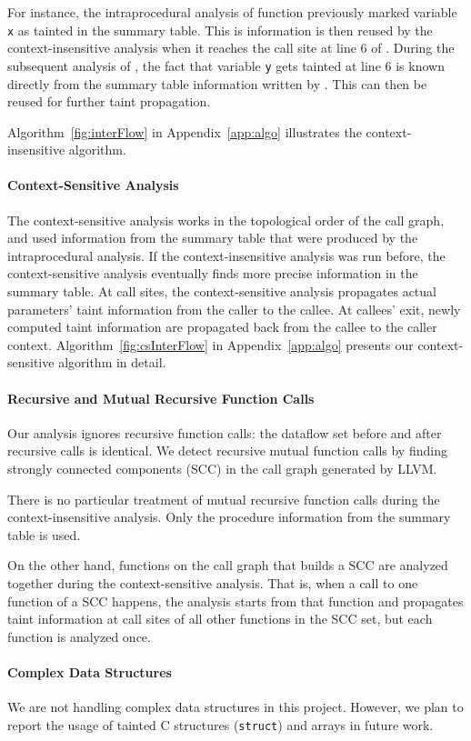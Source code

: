 For instance, the intraprocedural analysis of function
\main{} previously marked variable \texttt{x} as tainted
in the summary table. This is information is then reused by
the context-insensitive analysis when it reaches the
call site at line $6$ of \main{}.
During the subsequent analysis of \main{}, the fact that
variable \texttt{y} gets tainted at line $6$ is known
directly from the summary table information written
by \compute{}. This can then be reused for further
taint propagation.

Algorithm~\ref{fig:interFlow} in Appendix~\ref{app:algo}
illustrates the context-insensitive algorithm.

\paragraph{Context-Sensitive Analysis}
The context-sensitive analysis works in the topological order
of the call graph, and used information from the summary table
that were produced by the intraprocedural analysis. If the
context-insensitive analysis was run before, the context-sensitive
analysis eventually finds more precise information in the summary
table.
At call sites, the context-sensitive analysis propagates
actual parameters' taint information from the caller to the
callee. At callees' exit, newly computed taint information
are propagated back from the callee to the caller context.
Algorithm~\ref{fig:csInterFlow} in Appendix~\ref{app:algo}
presents our context-sensitive algorithm in detail.

\paragraph{Recursive and Mutual Recursive Function Calls} 
Our analysis ignores recursive function calls: the dataflow set
before and after recursive calls is identical.
We detect recursive mutual function calls by finding strongly
connected components (SCC) in the call graph generated by LLVM.

There is no particular treatment of mutual recursive function
calls during the context-insensitive analysis. Only the
procedure information from the summary table is used.

On the other hand, functions on the call graph that builds a
SCC are analyzed together during the context-sensitive analysis.
That is, when a call to one function of a SCC happens,
the analysis starts from that function and propagates taint
information at call sites of all other functions in the SCC set,
but each function is analyzed once.

\paragraph{Complex Data Structures}

We are not handling complex data structures in this project.
However, we plan to report the usage of tainted C structures
(\texttt{struct}) and arrays in future work.